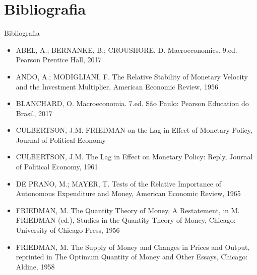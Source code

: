 \documentclass[10pt]{beamer}
\begin{document}
\section{Bibliografia}
\begin{frame}{ Bibliografia}
    \begin{itemize}   
        \item ABEL, A.; BERNANKE, B.; CROUSHORE, D. Macroeconomics. 9.ed. Pearson Prentice Hall, 2017\medskip        
        \item ANDO, A.; MODIGLIANI, F. The Relative Stability of Monetary Velocity and the Investment Multiplier, American Economic Review, 1956 \medskip
        \item BLANCHARD, O. Macroeconomia. 7.ed. São Paulo: Pearson Education do Brasil, 2017\medskip                     
        \item CULBERTSON, J.M. FRIEDMAN on the Lag in Effect of Monetary Policy, Journal of Political Economy \medskip
        \item CULBERTSON, J.M. The Lag in Effect on Monetary Policy: Reply, Journal of Political Economy, 1961 \medskip
        \item DE PRANO, M.; MAYER, T. Tests of the Relative Importance of Autonomous Expenditure and Money, American Economic Review, 1965 \medskip
        \item FRIEDMAN, M. The Quantity Theory of Money, A Restatement, in M. FRIEDMAN (ed.), Studies in the Quantity Theory of Money, Chicago: University of Chicago Press, 1956 \medskip
        \item FRIEDMAN, M. The Supply of Money and Changes in Prices and Output, reprinted in The Optimum Quantity of Money and Other Essays, Chicago: Aldine, 1958 \medskip        
    \end{itemize}
\end{frame}
\end{document}
